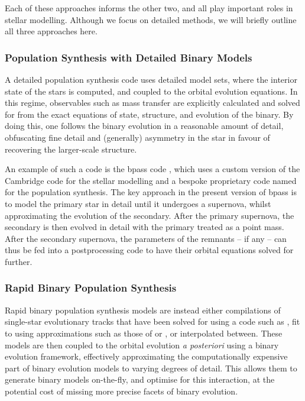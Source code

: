 Each of these approaches informs the other two, and all play important roles in stellar modelling. Although we focus on detailed methods, we will briefly outline all three approaches here.

\subsubsection{Population Synthesis with Detailed Binary Models}

A detailed population synthesis code uses detailed model sets, where the interior state of the stars is computed, and coupled to the orbital evolution equations. In this regime, observables such as mass transfer are explicitly calculated and solved for from the exact equations of state, structure, and evolution of the binary. By doing this, one follows the binary evolution in a reasonable amount of detail, obfuscating fine detail and (generally) asymmetry in the star in favour of recovering the larger-scale structure.

An example of such a code is the \gls{bpass} code \citep{Eldridge:2017}, which uses a custom version of the Cambridge  code for the stellar modelling and a bespoke proprietary code named  for the population synthesis. The key approach in the present version of \gls{bpass} is to model the primary star in detail until it undergoes a supernova, whilst approximating the evolution of the secondary. After the primary supernova, the secondary is then evolved in detail with the primary treated as a point mass. After the secondary supernova, the parameters of the remnants -- if any -- can thus be fed into a postprocessing code to have their orbital equations solved for further.

\subsubsection{Rapid Binary Population Synthesis}

Rapid binary population synthesis models are instead either compilations of single-star evolutionary tracks that have been solved for using a code such as  \citep{Paxton:2011, Paxton:2013, Paxton:2015, Paxton:2018, Paxton:2019, Jermyn:2023}, fit to using approximations such as those of \citet{Hurley:2000} or \citet{Hurley:2002}, or interpolated between. These models are then coupled to the orbital evolution \textit{a posteriori} using a binary evolution framework, effectively approximating the computationally expensive part of binary evolution models to varying degrees of detail. This allows them to generate binary models on-the-fly, and optimise for this interaction, at the potential cost of missing more precise facets of binary evolution.

